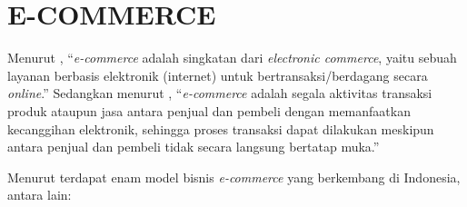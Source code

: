 \section{\uppercase{E-commerce}}
Menurut \citep{yuhefizar2013}, “\textit{e-commerce} adalah singkatan dari \textit{electronic commerce}, yaitu sebuah layanan berbasis elektronik (internet) untuk bertransaksi/berdagang secara \textit{online}.” Sedangkan menurut \citep{saputra2013}, “\textit{e-commerce} adalah segala aktivitas transaksi produk ataupun jasa antara penjual dan pembeli dengan memanfaatkan kecanggihan elektronik, sehingga proses transaksi dapat dilakukan meskipun antara penjual dan pembeli tidak secara langsung bertatap muka.”

Menurut \citep{pradana2015klasifikasi} terdapat enam model bisnis \textit{e-commerce} yang berkembang di Indonesia, antara lain:

